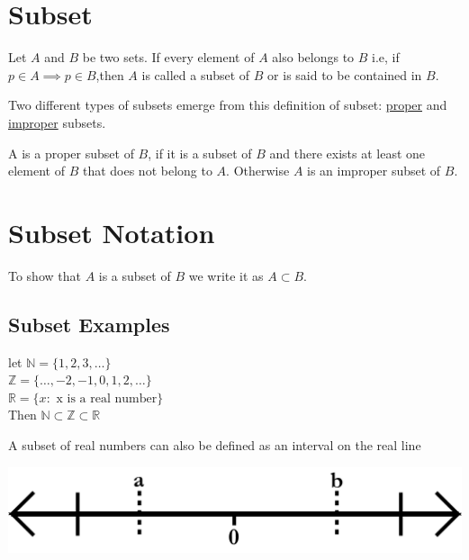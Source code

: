 \section{Subset}

\begin{definition}
    Let $A$ and $B$ be two sets. If every element of $A$ also belongs to $B$ i.e, if $p \in A \implies p \in B$,then $A$ is called a subset of $B$ or is said to be contained in $B$.
\end{definition}

\begin{para}
    Two different types of subsets emerge from this definition of subset: \underline{proper} and \underline{improper} subsets.
\end{para}

\begin{definition}
    A is a proper subset of $B$, if it is a subset of $B$ and there exists at least one element of $B$ that does not belong to $A$. Otherwise $A$ is an improper subset of $B$.
\end{definition}

\section{Subset Notation}

\begin{para}
    To show that $A$ is a subset of $B$ we write it as $A \subset B$.
\end{para}

\subsection{Subset Examples}

let
$\mathbb{N} = \{1, 2, 3, \ldots\}$\\
$\mathbb{Z} = \{\ldots, -2, -1, 0, 1, 2, \ldots\}$\\
$\mathbb{R} = \{x: \text{ x is a real number}\}$\\

Then $\mathbb{N} \subset \mathbb{Z} \subset \mathbb{R}$

\begin{para}
    A subset of real numbers can also be defined as an interval on the real line

    \begin{center}
        \includegraphics[width=0.3\linewidth]{chapter/sets and elements/numberLine.png}
    \end{center}

\end{para}


